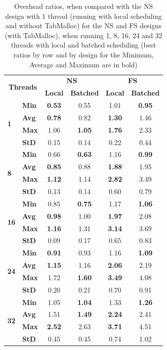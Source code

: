 \documentclass{llncs}
\begin{document}
\setlength{\tabcolsep}{12pt}
\begin{table}[!ht]
\centering
\caption{Overhead ratios, when compared with the NS design with $1$
  thread (running with local scheduling and without TabMalloc) for the NS
  and FS designs (with TabMalloc), when running 1, 8, 16, 24 and 32
  threads with local and batched scheduling (best ratios by row and by
  design for the Minimum, Average and Maximum are in bold)}
\begin{tabular}{ll||cc|cc}
\multicolumn{2}{c||}{\multirow{2}{*}{\bf Threads}} &
\multicolumn{2}{c|}{\multirow{1}{*}{\bf NS}} &
\multicolumn{2}{|c}{\multirow{1}{*}{\bf FS}}\\ \cline{3-6}
& 
& \multicolumn{1}{c}{\bf Local}
& \multicolumn{1}{c}{\bf Batched}
& \multicolumn{1}{|c}{\bf Local}
& \multicolumn{1}{c}{\bf Batched}\\
\hline\hline
\multirow{4}{*}{\bf 1}
& {\bf Min }& {\bf 0.53}& 0.55& 1.01& {\bf 0.95}\\
& {\bf Avg }& {\bf 0.78}& 0.82& {\bf 1.30}& 1.46\\
& {\bf Max }& 1.06& {\bf 1.05}& {\bf 1.76}& 2.33\\
& {\bf StD }& 0.15& 0.14& 0.22& 0.44\\
\hline
\multirow{4}{*}{\bf 8}
& {\bf Min }& 0.66& {\bf 0.63}& 1.16&{\bf  0.99}\\
& {\bf Avg }& {\bf 0.85}& 0.88& {\bf 1.88}& 1.95\\
& {\bf Max }& {\bf 1.12}& 1.14& {\bf 2.82}& 3.49\\
& {\bf StD }& 0.13& 0.14& 0.60& 0.79\\
\hline
\multirow{4}{*}{\bf 16}
& {\bf Min }& 0.85& {\bf 0.75}& 1.17& {\bf 1.06}\\
& {\bf Avg }& {\bf 0.98}& 1.00& {\bf 1.97}& 2.08\\
& {\bf Max }& {\bf 1.16}& 1.31& {\bf 3.14}& 3.69\\
& {\bf StD }& 0.09& 0.17& 0.65& 0.83\\
\hline
\multirow{4}{*}{\bf 24}
& {\bf Min }& {\bf 0.91}& 0.93& 1.16& {\bf 1.09}\\
& {\bf Avg }& {\bf 1.15}& 1.16& {\bf 2.06}& 2.19\\
& {\bf Max }& 1.72& {\bf 1.60}& {\bf 3.49}& 4.08\\
& {\bf StD }& 0.20& 0.21& 0.70& 0.91\\
\hline
\multirow{4}{*}{\bf 32}
& {\bf Min }& 1.05& {\bf 1.04}& 1.33& {\bf 1.26}\\
& {\bf Avg }& 1.51& {\bf 1.49}& {\bf 2.24}& 2.41\\
& {\bf Max }& {\bf 2.52}& 2.63& {\bf 3.71}& 4.51\\
& {\bf StD }& 0.45& 0.45& 0.74& 1.02\\
\end{tabular}
\label{tab_batched_overhead}
\end{table}
\end{document}
